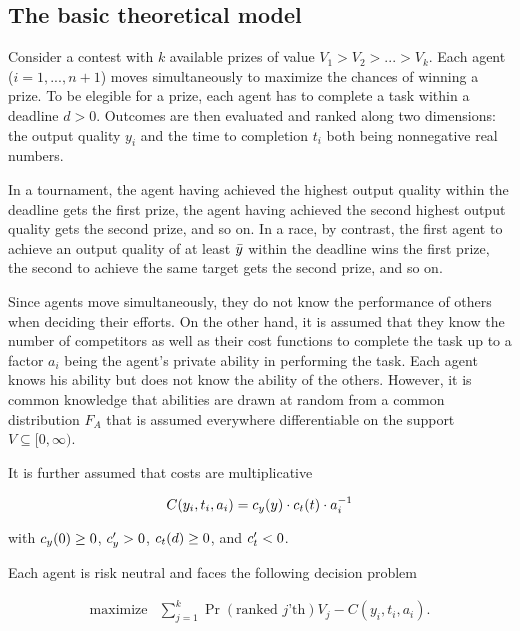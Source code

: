 \documentclass[12pt, titlepage, draft]{article} \usepackage[utf8]{inputenc}                           \usepackage[english]{babel}                           \usepackage{amsmath,amssymb,amsfonts}                 \usepackage{xcolor,tikz,graphicx,subfig}              \usepackage{rotating,multirow,array,dcolumn,booktabs} \usepackage{natbib}                                   
\begin{document}
\subsection{The basic theoretical
model}\label{the-basic-theoretical-model}

Consider a contest with \(k\) available prizes of value
\(V_1 > V_2 > ... > V_k\). Each agent (\(i=1, ..., n+1\)) moves
simultaneously to maximize the chances of winning a prize. To be
elegible for a prize, each agent has to complete a task within a
deadline \(d>0\). Outcomes are then evaluated and ranked along two
dimensions: the output quality \(y_i\) and the time to completion
\(t_i\) both being nonnegative real numbers.

In a tournament, the agent having achieved the highest output quality
within the deadline gets the first prize, the agent having achieved the
second highest output quality gets the second prize, and so on. In a
race, by contrast, the first agent to achieve an output quality of at
least \(\bar y\) within the deadline wins the first prize, the second
to achieve the same target gets the second prize, and so on.

Since agents move simultaneously, they do not know the performance of
others when deciding their efforts. On the other hand, it is assumed
that they know the number of competitors as well as their cost functions
to complete the task up to a factor \(a_i\) being the agent's private
ability in performing the task. Each agent knows his ability but does
not know the ability of the others. However, it is common knowledge that
abilities are drawn at random from a common distribution \(F_A\) that is
assumed everywhere differentiable on the support
\(V\subseteq [0, \infty)\).

It is further assumed that costs are multiplicative

\begin{equation}
  C(y_i, t_i, a_i) = c_{y} (y) \cdot c_{t} (t)  \cdot a_i^{-1}
\end{equation}

with \(c_{y}(0)\geq 0\), \(c_{y}^\prime>0\), \(c_{t}(d)\geq 0\),
and \(c_{t}^\prime<0\).

Each agent is risk neutral and faces the following decision problem

\begin{equation}
  \begin{array}{ll}
    \mbox{maximize} & \sum_{j=1}^k \Pr(\text{ranked $j$'th}) V_j  - C(y_i, t_i, a_i).
  \end{array}
\end{equation}
\end{document}
